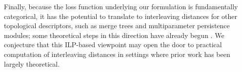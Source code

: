 Finally, because the loss function underlying our formulation is fundamentally categorical, it has the potential to translate to interleaving distances for other topological descriptors, such as merge trees and multiparameter persistence modules; some theoretical steps in this direction have already begun \cite{Olave2026}. 
We conjecture that this ILP-based viewpoint may open the door to practical computation of interleaving distances in settings where prior work has been largely theoretical.


